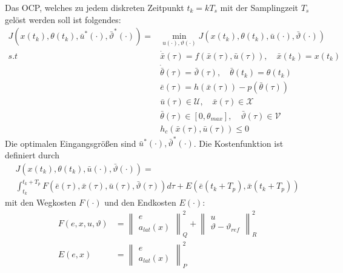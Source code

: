 \medskip
\noindent Das OCP, welches zu jedem diskreten Zeitpunkt $t_k=kT_s$ mit der Samplingzeit $T_s$ gelöst werden soll ist folgendes:
\begin{subequations}
\begin{align}
    J(x(t_k),\theta(t_k),\bar{u}^{*}(\cdot),\bar{\vartheta}^{*}(\cdot)) = &\underset{u(\cdot), \vartheta(\cdot)}{\min} J(x(t_k), \theta(t_k), \bar{u}(\cdot), \bar{\vartheta}(\cdot)) \label{eq:minProblemA}\\
    s.t \hspace{30pt} &\dot{\bar{x}}(\tau) = f(\bar{x}(\tau), \bar{u}(\tau)), \quad \bar{x}(t_k) = x(t_k) \label{eq:minProblemB}\\
    &\dot{\bar{\theta}}(\tau) = \bar{\vartheta}(\tau), \quad \bar{\theta}(t_k) = \theta(t_k) \label{eq:minProblemC}\\
    &\bar{e}(\tau) = h(\bar{x}(\tau)) - p(\bar{\theta}(\tau)) \label{eq:minProblemD}\\
    &\bar{u}(\tau) \in \mathcal{U}, \quad \bar{x}(\tau) \in \mathcal{X} \label{eq:minProblemE}\\
    &\bar{\theta}(\tau) \in [0, \theta_{max}], \quad \bar{\vartheta}(\tau) \in \mathcal{V} \label{eq:minProblemF}\\
    &h_c(\bar{x}(\tau), \bar{u}(\tau)) \leq 0 \label{eq:minProblemG}
\end{align}
\end{subequations}
\noindent Die optimalen Eingangsgrößen sind $\bar{u}^{*}(\cdot),\bar{\vartheta}^{*}(\cdot)$. Die Kostenfunktion ist definiert durch
\begin{multline}
    J(x(t_k),\theta(t_k),\bar{u}(\cdot),\bar{\vartheta}(\cdot)) = \\ \int_{t_k}^{t_k + T_p} F(\bar{e}(\tau),\bar{x}(\tau),\bar{u}(\tau),\bar{\vartheta}(\tau))d\tau + E(\bar{e}(t_k+T_p),\bar{x}(t_k+T_p))
\end{multline}
\noindent mit den Wegkosten $F(\cdot)$ und den Endkosten $E(\cdot)$:
\begin{align}
    F(e, x, u, \vartheta) &= \left\| \begin{matrix} e \\a_{lat}(x) \end{matrix} \right\|_Q^2 + \left\| \begin{matrix} u \\ \vartheta - \vartheta_{ref} \end{matrix} \right\|_R^2 \\
    E(e, x) &= \left\| \begin{matrix} e \\ a_{lat}(x) \end{matrix} \right\|_P^2
\end{align}
